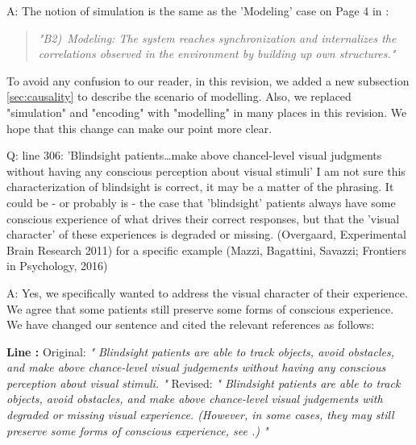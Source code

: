 \documentclass[utf8]{article}
\newcounter{cQuestion}[section]
\newenvironment{question}
    {\refstepcounter{cQuestion}\color{Blue}\noindent\newline Q\thecQuestion:}
    {~\newline}
\newenvironment{ans}  
    {\color{Black}\noindent A:}
    {~\newline}
\newcommand{\revise}[3]{
	\newline
	\newline
    \noindent
    \textbf{Line #1:}
    \newline
    Original:\newline
    \textit{"#2"}
    \newline
    \newline
    Revised:\newline
    \textit{"#3"}\newline}
\begin{document}
    	\begin{ans}
    		The notion of simulation is the same as the 'Modeling' case on Page 4 in \cite{BERTSCHINGER.2006}: 
    		\begin{quote}
		    	\textit{"B2)~Modeling: The system reaches synchronization and internalizes the correlations observed in the environment by building up own structures."}
    		\end{quote}
    	    
    	    To avoid any confusion to our reader, in this revision, we added a new subsection \ref{sec:causality} to describe the scenario of modelling.
    		Also, we replaced "simulation" and "encoding" with "modelling" in many places in this revision. We hope that this change can make our point more clear. 
    	\end{ans}
    
   	\begin{question}
			line 306: 'Blindsight patients\dots make above chancel-level visual judgments without having any conscious perception about visual stimuli' I am not sure this characterization of blindsight is correct, it may be a matter of the phrasing. It could be - or probably is - the case that 'blindsight' patients always have some conscious experience of what drives their correct responses, but that the 'visual character' of these experiences is degraded or missing.
			(Overgaard, Experimental Brain Research 2011)
			for a specific example
			(Mazzi, Bagattini, Savazzi; Frontiers in Psychology, 2016)
    	\end{question}
    
    
   		\begin{ans}
   			Yes, we specifically wanted to address the visual character of their experience. We agree that some patients still preserve some forms of conscious experience. 
   			We have changed our sentence and cited the relevant references as follows:
   			\revise{}
   			{
   				Blindsight patients are able to track objects, avoid obstacles, and make above chance-level visual judgements without having any conscious perception about visual stimuli.
   			}
   			{
   				Blindsight patients are able to track objects, avoid obstacles, and make above chance-level visual judgements with degraded or missing visual experience. (However, in some cases, they may still preserve some forms of conscious experience, see \cite{overgaard2011visual, mazzi2016blind}.) 
   			}
   		\end{ans}
\end{document}
